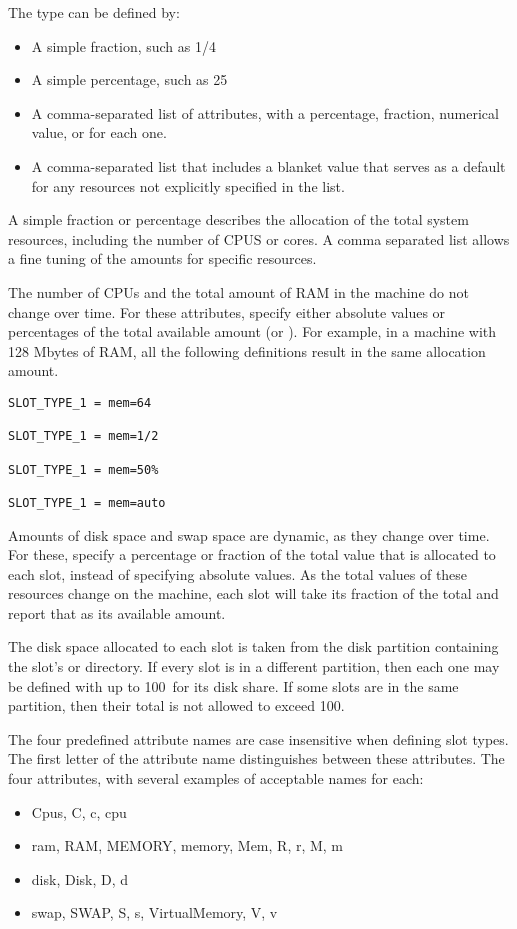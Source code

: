 \begin{description}
The type can be defined by:
\begin{itemize}
  \item A simple fraction, such as 1/4
  \item A simple percentage, such as 25\Percent
  \item A comma-separated list of attributes, with a percentage,
	fraction, numerical value, or  for each one.
  \item A comma-separated list that includes a blanket value that serves
        as a default for any resources not explicitly specified in the list.
\end{itemize}
A simple fraction or percentage describes the allocation
of the total system resources,
including the number of CPUS or cores.
A comma separated list allows a fine tuning of
the amounts for specific resources.

The number of CPUs
and the total amount of RAM in
the machine do not change over time.
For these attributes, specify either absolute values or
percentages of the total available amount (or ).  
For example, in a machine with 128 Mbytes of RAM,
all the following definitions result in the same allocation amount.
\begin{verbatim}
SLOT_TYPE_1 = mem=64

SLOT_TYPE_1 = mem=1/2

SLOT_TYPE_1 = mem=50%

SLOT_TYPE_1 = mem=auto
\end{verbatim}

Amounts of disk space and swap space are dynamic, as they change over time.
For these, specify a percentage or fraction of the total
value that is allocated to each slot, instead of specifying absolute values.
As the total values of these resources change on the machine, each
slot will take its fraction of the total and report that as its
available amount.

The disk space allocated to each slot is taken from the disk partition
containing the slot's  or  directory.
If every slot is in a different partition, 
then each one may be defined with up to
100\Percent\ for its disk share.  If some slots are in the same
partition, then their total is not allowed to exceed 100\Percent.

The four predefined attribute names are case insensitive when defining 
slot types.
The first letter of the attribute name distinguishes between
these attributes.
The four attributes, with several examples of acceptable names for each:
\begin{itemize}
  \item Cpus, C, c, cpu 
  \item ram, RAM, MEMORY, memory, Mem, R, r, M, m
  \item disk, Disk, D, d
  \item swap, SWAP, S, s, VirtualMemory, V, v
\end{itemize}


\end{description}
